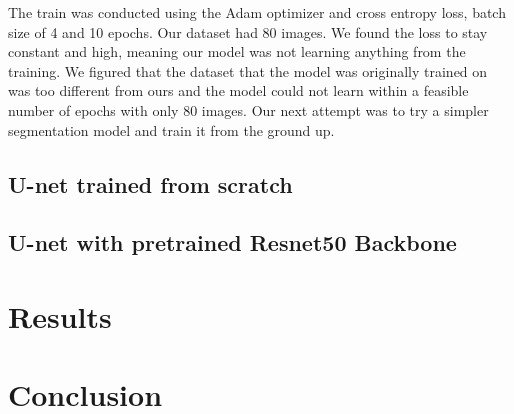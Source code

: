 \documentclass{ieeeaccess}
\begin{document}
The train was conducted using the Adam optimizer and cross entropy loss, batch size of 4 and 10 epochs. Our dataset had 80 images. We
found the loss to stay constant and high, meaning our model was not learning anything from the training. We figured that the dataset
that the model was originally trained on was too different from ours and the model could not learn within a feasible number of epochs
with only 80 images. Our next attempt was to try a simpler segmentation model and train it from the ground up.

\subsection{U-net trained from scratch}

\subsection{U-net with pretrained Resnet50 Backbone}






\section{Results}

  \lipsum[1-2]

\section{Conclusion}

  \lipsum[1-2]

\EOD
\end{document}
